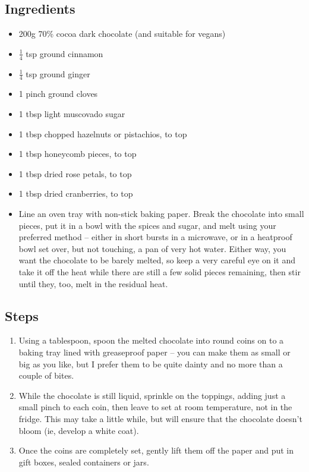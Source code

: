 \documentclass{book}
\begin{document}
\subsection*{Ingredients}
\begin{itemize}
\item 200g 70\% cocoa dark chocolate (and suitable for vegans)
\item $\frac{1}{4}$ tsp ground cinnamon 
\item $\frac{1}{4}$ tsp ground ginger 
\item 1 pinch ground cloves 
\item 1 tbsp light muscovado sugar
\item 1 tbsp chopped hazelnuts or pistachios, to top 
\item 1 tbsp honeycomb pieces, to top 
\item 1 tbsp dried rose petals, to top 
\item 1 tbsp dried cranberries, to top
\end{itemize}

\begin{itemize}
\item Line an oven tray with non-stick baking paper. Break the chocolate into small pieces, put it in a bowl with the spices and sugar, and melt using your preferred method – either in short bursts in a microwave, or in a heatproof bowl set over, but not touching, a pan of very hot water. Either way, you want the chocolate to be barely melted, so keep a very careful eye on it and take it off the heat while there are still a few solid pieces remaining, then stir until they, too, melt in the residual heat.
\end{itemize}

\subsection*{Steps}
\begin{enumerate}
\item Using a tablespoon, spoon the melted chocolate into round coins on to a baking tray lined with greaseproof paper – you can make them as small or big as you like, but I prefer them to be quite dainty and no more than a couple of bites.
\item While the chocolate is still liquid, sprinkle on the toppings, adding just a small pinch to each coin, then leave to set at room temperature, not in the fridge. This may take a little while, but will ensure that the chocolate doesn’t bloom (ie, develop a white coat).
\item Once the coins are completely set, gently lift them off the paper and put in gift boxes, sealed containers or jars. 
\end{enumerate}
\newpage
\end{document}
